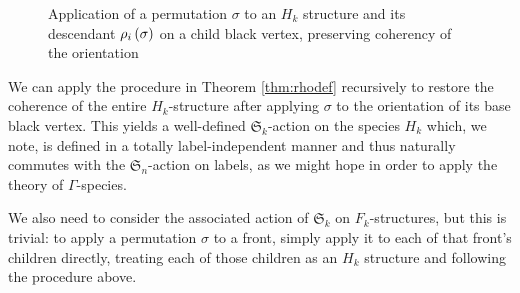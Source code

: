 \documentclass[sectionflow,singlespace,twoside,boldmathhdr]{brandiss} %
\numberwithin{section}{chapter}
\numberwithin{figure}{chapter}
\begin{document}
\begin{figure}[htbp]
  \centering
  \caption{Application of a permutation $\sigma$ to an $H_{k}$ structure and its descendant $\rho_{i} \left( {\sigma} \right)$ on a child black vertex, preserving coherency of the orientation}
  \label{fig:rhoapp}
\end{figure}

We can apply the procedure in Theorem \ref{thm:rhodef} recursively to restore the coherence of the entire $H_{k}$-structure after applying $\sigma$ to the orientation of its base black vertex.
This yields a well-defined $\mathfrak{S}_{k}$-action on the species $H_{k}$ which, we note, is defined in a totally label-independent manner and thus naturally commutes with the $\mathfrak{S}_{n}$-action on labels, as we might hope in order to apply the theory of $\Gamma$-species.

We also need to consider the associated action of $\mathfrak{S}_{k}$ on $F_{k}$-structures, but this is trivial: to apply a permutation $\sigma$ to a front, simply apply it to each of that front's children directly, treating each of those children as an $H_{k}$ structure and following the procedure above.
\end{document}
